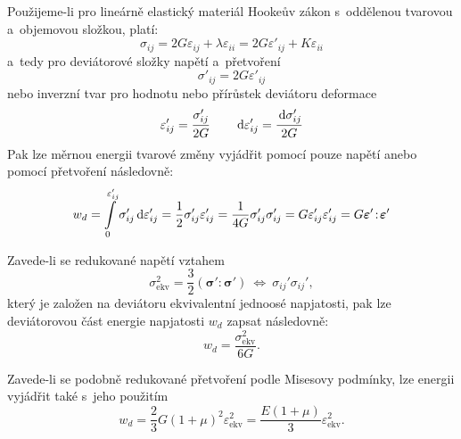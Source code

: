 Použijeme-li pro lineárně elastický materiál Hookeův zákon s~oddělenou tvarovou a~objemovou složkou, platí:
\begin{equation}
	\sigma_{ij}
	= 2 G \varepsilon_{ij} + \lambda \varepsilon_{ii}
	= 2 G \varepsilon'_{ij} + K \varepsilon_{ii}
\end{equation}
a~tedy pro deviátorové složky napětí a~přetvoření
\begin{equation}
	\sigma'_{ij} = 2 G \varepsilon'_{ij}
\end{equation}
nebo inverzní tvar pro hodnotu nebo přírůstek deviátoru deformace
\begin{equation}
	\varepsilon'_{ij} = \frac{\sigma'_{ij}}{2 G} \qquad
	\,\mathrm{d}\varepsilon'_{ij} = \frac{\,\mathrm{d} \sigma'_{ij}}{2 G}
\end{equation}
Pak lze měrnou energii tvarové změny vyjádřit pomocí pouze napětí anebo pomocí přetvoření následovně:
\begin{equation}
	w_d
	= \int\limits_0^{\varepsilon'_{ij}} \sigma'_{ij} \,\mathrm{d} \varepsilon'_{ij}
	= \frac{1}{2} \sigma'_{ij} \varepsilon'_{ij}
	= \frac{1}{4 G} \sigma'_{ij} \sigma'_{ij}
	= G \varepsilon'_{ij} \varepsilon'_{ij}
	= G \bm{\varepsilon}' \!:\! \bm{\varepsilon}'
\end{equation}

Zavede-li se redukované napětí vztahem
\begin{equation}
	\sigma_\text{ekv}^2
	= \frac{3}{2} (\bm{\sigma}' \!:\! \bm{\sigma}')
	\:\Leftrightarrow\: \sigma_{ij}' \sigma_{ij}',
\end{equation}
který je založen na deviátoru ekvivalentní jednoosé napjatosti, pak lze deviátorovou část energie napjatosti $w_d$ zapsat následovně:
\begin{equation}
	w_d = \frac{\sigma_\text{ekv}^2}{6 G}.
\end{equation}

Zavede-li se podobně redukované přetvoření podle Misesovy podmínky, lze energii vyjádřit také s~jeho použitím
\begin{equation}
	w_d
	= \frac{2}{3} G (1+\mu)^2 \varepsilon_\text{ekv}^2
	= \frac{E (1+\mu)}{3} \varepsilon_\text{ekv}^2.
\end{equation}

